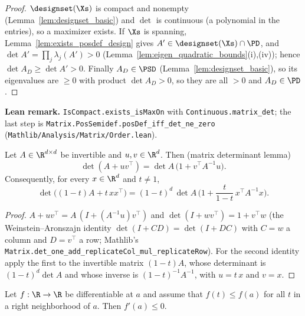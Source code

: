 \begin{proof}
\leanok
{}
$\designset(\Xs)$ is compact and nonempty (Lemma~\ref{lem:designset_basic}) and $\det$ is
continuous (a polynomial in the entries), so a maximizer exists. If $\Xs$ is spanning,
Lemma~\ref{lem:exists_posdef_design} gives $A' \in \designset(\Xs) \cap \PD$, and
$\det A' = \prod_j \lambda_j(A') > 0$ (Lemma~\ref{lem:eigen_quadratic_bounds}(i),(iv)); hence
$\det A_D \ge \det A' > 0$. Finally $A_D \in \PSD$ (Lemma~\ref{lem:designset_basic}), so its
eigenvalues are $\ge 0$ with product $\det A_D > 0$, so they are all $> 0$ and $A_D \in \PD$.
\end{proof}

\textbf{Lean remark.} \texttt{IsCompact.exists\_isMaxOn} with \texttt{Continuous.matrix\_det};
the last step is \texttt{Matrix.PosSemidef.posDef\_iff\_det\_ne\_zero}
(\texttt{Mathlib/Analysis/Matrix/Order.lean}).

\begin{lemma}\label{lem:det_rank_one_mix}
\leanok
Let $A \in \R^{d\times d}$ be invertible and $u, v \in \R^d$. Then (matrix determinant lemma)
\[
  \det(A + uv^\top) = \det A\,\big(1 + v^\top A^{-1} u\big) .
\]
Consequently, for every $x \in \R^d$ and $t \ne 1$,
\[
  \det\big((1-t)A + t\,xx^\top\big) = (1-t)^d\,\det A\,\Big(1 + \frac{t}{1-t}\,x^\top A^{-1}x\Big) .
\]
\end{lemma}

\begin{proof}
\leanok
$A + uv^\top = A\,(I + (A^{-1}u)v^\top)$ and $\det(I + wv^\top) = 1 + v^\top w$ (the
Weinstein--Aronszajn identity $\det(I + CD) = \det(I + DC)$ with $C = w$ a column and $D = v^\top$
a row; Mathlib's \texttt{Matrix.det\_one\_add\_replicateCol\_mul\_replicateRow}). For the second
identity apply the first to the invertible matrix $(1-t)A$, whose determinant is $(1-t)^d\det A$
and whose inverse is $(1-t)^{-1}A^{-1}$, with $u = t\,x$ and $v = x$.
\end{proof}

\begin{lemma}\label{lem:deriv_nonpos_right_max}
\leanok
Let $f : \R \to \R$ be differentiable at $a$ and assume that $f(t) \le f(a)$ for all $t$ in a
right neighborhood of $a$. Then $f'(a) \le 0$.
\end{lemma}

